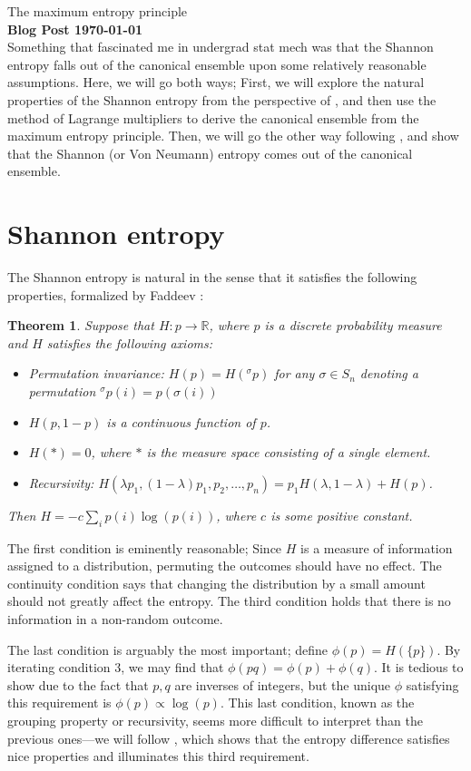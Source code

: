\documentclass[11pt]{article}
\newtheorem{thm}{Theorem}
\theoremstyle{remark}
\begin{document}
\noindent\huge{The maximum entropy principle} \\
\normalsize\textbf{Blog Post \today} \\

Something that fascinated me in undergrad stat mech was that the Shannon entropy
falls out of the canonical ensemble upon some relatively reasonable assumptions.
Here, we will go both ways; First, we will explore the natural properties of the
Shannon entropy from the perspective of \cite{baez}, and then use the method of Lagrange multipliers to derive the canonical
ensemble from the maximum entropy principle. Then, we will go the other way
following \cite{reif}, and
show that the Shannon (or Von Neumann) entropy comes out of the canonical ensemble.

\section{Shannon entropy}
The Shannon entropy is natural in the sense that it satisfies the following
properties, formalized by Faddeev \cite{faddeev}:
\begin{thm}
  Suppose that $H: p \to \mathbb R$, where $p$ is a discrete probability measure and $H$
  satisfies the following axioms:
\begin{itemize}
\item Permutation invariance: $H(p) = H({}^{\sigma}p)$ for any $\sigma \in S_n$ denoting a permutation
  ${}^{\sigma}p(i) = p(\sigma(i))$
\item $H(p, 1-p)$ is a continuous function of $p$.
\item $H(\ast) = 0$, where $\ast$ is the measure space consisting of a single element.
\item Recursivity: $H(\lambda p_1, (1-\lambda)p_1, p_2, \dots, p_n) = p_1 H(\lambda, 1-\lambda) + H(p)$.
\end{itemize}
Then $H = -c \sum_{i}p(i)\log(p(i))$, where $c$ is some positive constant.
\end{thm}

The first condition is eminently reasonable; Since $H$ is a measure of
information assigned to a distribution, permuting the outcomes should have no effect.
The continuity condition says that changing the distribution by a small amount should
not greatly affect the entropy. The third condition holds that there is no
information in a non-random outcome.

The last condition is arguably the most important; define $\phi(p) = H(\{p\})$.
By iterating condition 3, we may find that $\phi(pq) = \phi(p) + \phi(q)$. It is
tedious to show due to the fact that $p,q$ are inverses of integers, but the
unique $\phi$ satisfying this requirement is $\phi(p) \propto \log(p)$. This
last condition, known as the grouping property or recursivity, seems more difficult to interpret than the previous ones---we
will follow \cite{baez}, which shows that the entropy difference satisfies nice
properties and illuminates this third requirement.
\end{document}
